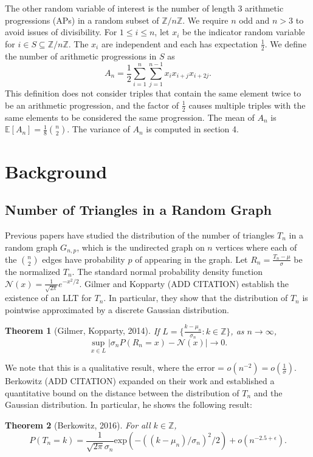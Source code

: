 \documentclass[12pt]{article} %
\newcommand{\f}[2]{\frac{#1}{#2}}
\newcommand{\p}[1]{\left(#1\right)}
\newcommand{\abs}[1]{\left\lvert#1\right\rvert}
\newcommand{\E}{\mathbb{E}}
\newcommand{\Z}{\mathbb{Z}}
\newtheorem{thm}{Theorem}[section]
\theoremstyle{definition}
\theoremstyle{remark}
\begin{document}
The other random variable of interest is the number of length 3 arithmetic progressions (APs) in a random subset of $\Z/n\Z$. We require $n$ odd and $n > 3$ to avoid issues of divisibility. For $1 \leq i \leq n$, let $x_i$ be the indicator random variable for $i \in S \subseteq \Z/n\Z$. The $x_i$ are independent and each has expectation $\f{1}{2}$. We define the number of arithmetic progressions in $S$ as
\[ A_n = \f{1}{2} \sum_{i=1}^{n} \sum_{j=1}^{n-1} x_i x_{i+j} x_{i+2j}. \]
This definition does not consider triples that contain the same element twice to be an arithmetic progression, and the factor of $\f{1}{2}$ causes multiple triples with the same elements to be considered the same progression. The mean of $A_n$ is $\E[A_n] = \f{1}{8}\binom{n}{2}$. The variance of $A_n$ is computed in section 4.


\section{Background}

\subsection{Number of Triangles in a Random Graph}
Previous papers have studied the distribution of the number of triangles $T_n$ in a random graph $G_{n,p}$, which is the undirected graph on $n$ vertices where each of the $n\choose2$ edges have probability $p$ of appearing in the graph. Let $R_n = \frac{T_n-\mu}{\sigma}$ be the normalized $T_n$. The standard normal probability density function $\mathcal{N}(x) = \frac{1}{\sqrt{2\pi}}e^{-x^2/2}.$ Gilmer and Kopparty (ADD CITATION) establish the existence of an LLT for $T_n$. In particular, they show that the distribution of $T_n$ is pointwise approximated by a discrete Gaussian distribution. 
\begin{thm}[Gilmer, Kopparty, 2014]
If $L = \{\frac{k-\mu_n}{\sigma_n}: k \in \Z \} $, as $n \rightarrow \infty$, \[\sup_{x\in L} \abs{\sigma_n P(R_n = x) - \mathcal{N}(x)} \rightarrow 0. \]
\end{thm}

We note that this is a qualitative result, where the error = $o(n^{-2}) = o(\frac{1}{\sigma})$. Berkowitz (ADD CITATION) expanded on their work and established a quantitative bound on the distance between the distribution of $T_n$ and the Gaussian distribution. In particular, he shows the following result:

\begin{thm}[Berkowitz, 2016]
For all $k \in \Z$, \[ P(T_n = k) = \f{1}{\sqrt{2\pi}\sigma_n} \mathrm{exp}\p{-((k-\mu_n)/\sigma_n)^2/2} + o(n^{-2.5+\epsilon}). \]
\end{thm}
\end{document}
